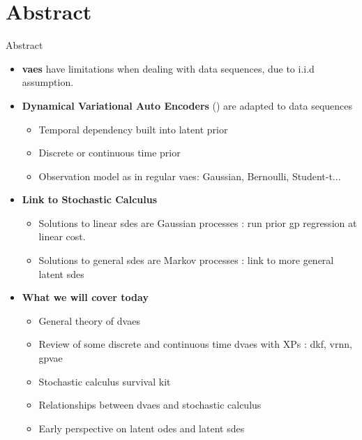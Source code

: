 \section{Abstract}\label{Abstract}

\begin{frame}{Abstract}
    \begin{itemize}
        \item <1-> \textbf{\glspl{vae}} have limitations when dealing with data sequences, due to i.i.d assumption.
        \item <2-> \textbf{Dynamical Variational Auto Encoders} (\cite{girin_dynamical_2022}) are adapted to data sequences
            \begin{itemize}
                \item Temporal dependency built into latent prior
                \item Discrete or continuous time prior
                \item Observation model as in regular \glspl{vae}: Gaussian, Bernoulli, Student-t...
            \end{itemize}
        \item <3-> \textbf{Link to Stochastic Calculus}
            \begin{itemize}
                \item Solutions to linear \glspl{sde} are Gaussian processes : run prior \gls{gp} regression at linear cost.
                \item Solutions to general \glspl{sde} are Markov processes : link to more general \glspl{latent sde}
            \end{itemize}
        \item <4-> \textbf{What we will cover today}
            \begin{itemize}
                \item General theory of \glspl{dvae}
                \item Review of some discrete and continuous time \glspl{dvae} with XPs : \gls{dkf}, \gls{vrnn}, \gls{gpvae}
                \item Stochastic calculus survival kit
                \item Relationships between \glspl{dvae} and stochastic calculus
                \item Early perspective on \glspl{latent ode} and \glspl{latent sde}
            \end{itemize}
    \end{itemize}
\end{frame}

